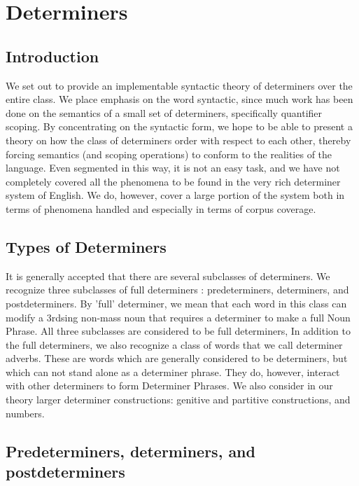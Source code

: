 \section{Determiners}
\subsection{Introduction}

  We set out to provide an implementable syntactic theory of determiners over
the entire class.  We place emphasis on the word syntactic, since much work
has been done on the semantics of a small set of determiners, specifically
quantifier scoping.  By concentrating on the syntactic form, we hope to be able
to present a theory on how the class of determiners order with respect to each
other, thereby forcing semantics (and scoping operations) to conform to the
realities of the language.  Even segmented in this way, it is not an easy task,
and we have not completely covered all the phenomena to be found in the very
rich determiner system of English.  We do, however, cover a large portion of
the system both in terms of phenomena handled and especially in terms of corpus
coverage.


\subsection{Types of Determiners}

It is generally accepted that there are several subclasses of determiners.  We
recognize three subclasses of full determiners : predeterminers, determiners,
and postdeterminers.  By 'full' determiner, we mean that each word in this
class can modify a 3rdsing non-mass noun that requires a determiner to make a
full Noun Phrase.  All three subclasses are considered to be full determiners,
In addition to the full determiners, we also recognize a class of words that we
call determiner adverbs.  These are words which are generally considered to be
determiners, but which can not stand alone as a determiner phrase.  They do,
however, interact with other determiners to form Determiner Phrases.  We also
consider in our theory larger determiner constructions: genitive and partitive
constructions, and numbers.

\subsection{Predeterminers, determiners, and postdeterminers}

